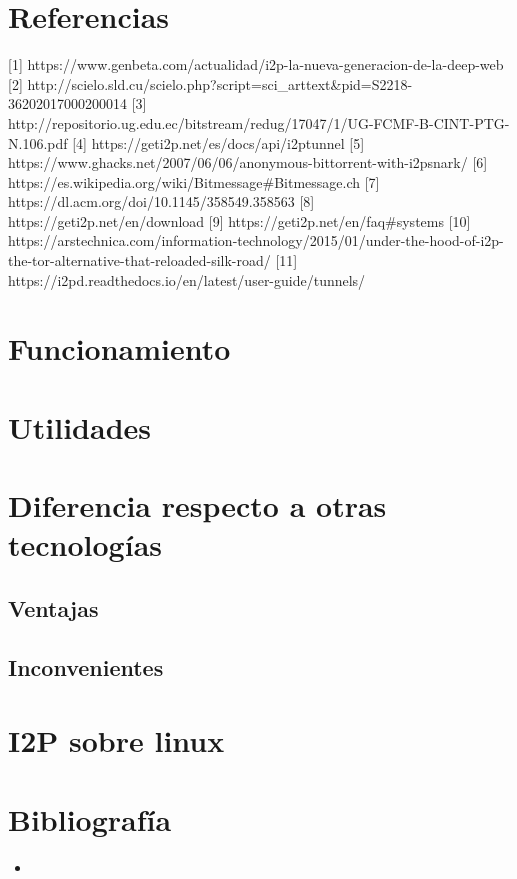 \documentclass[12]{article}
\begin{document}
\pagebreak

\section{Referencias}

[1] https://www.genbeta.com/actualidad/i2p-la-nueva-generacion-de-la-deep-web 
[2] http://scielo.sld.cu/scielo.php?script=sci\_arttext\&pid=S2218-36202017000200014
[3] http://repositorio.ug.edu.ec/bitstream/redug/17047/1/UG-FCMF-B-CINT-PTG-N.106.pdf
[4] https://geti2p.net/es/docs/api/i2ptunnel 
[5] https://www.ghacks.net/2007/06/06/anonymous-bittorrent-with-i2psnark/ 
[6] https://es.wikipedia.org/wiki/Bitmessage\#Bitmessage.ch 
[7] https://dl.acm.org/doi/10.1145/358549.358563 
[8] https://geti2p.net/en/download 
[9] https://geti2p.net/en/faq\#systems 
[10] https://arstechnica.com/information-technology/2015/01/under-the-hood-of-i2p-the-tor-alternative-that-reloaded-silk-road/ 
[11] https://i2pd.readthedocs.io/en/latest/user-guide/tunnels/ 



\section{Funcionamiento}
\section{Utilidades}
\section{Diferencia respecto a otras tecnologías}
\subsection{Ventajas}
\subsection{Inconvenientes}
\section{I2P sobre linux}
\section{Bibliografía}
\begin{itemize}
    \item %
\end{itemize}
\end{document}
